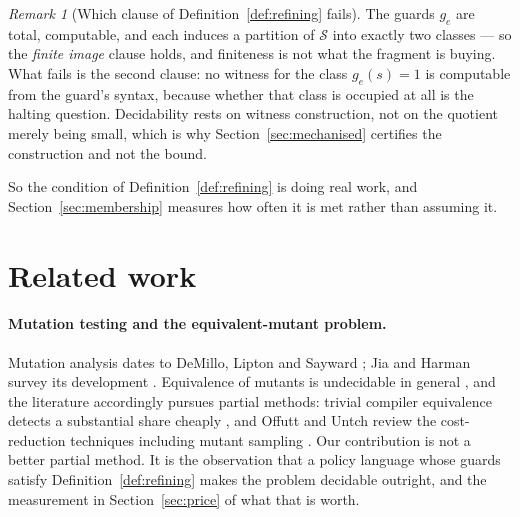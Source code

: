 \documentclass[11pt,a4paper]{article}
\theoremstyle{plain}
\theoremstyle{definition}
\theoremstyle{remark}
\newtheorem{remark}[theorem]{Remark}
\newcommand{\Sub}{\mathcal{S}}
\begin{document}
\begin{remark}[Which clause of Definition~\ref{def:refining} fails]
The guards $g_e$ are total, computable, and each induces a partition of $\Sub$ into exactly
two classes --- so the \emph{finite image} clause holds, and finiteness is not what the
fragment is buying. What fails is the second clause: no witness for the class $g_e(s) = 1$ is
computable from the guard's syntax, because whether that class is occupied at all is the
halting question. Decidability rests on witness construction, not on the quotient merely
being small, which is why Section~\ref{sec:mechanised} certifies the construction and not the
bound.
\end{remark}

So the condition of Definition~\ref{def:refining} is doing real work, and
Section~\ref{sec:membership} measures how often it is met rather than assuming it.

\section{Related work}
\label{sec:related}

\paragraph{Mutation testing and the equivalent-mutant problem.} Mutation analysis dates to
DeMillo, Lipton and Sayward \cite{demillo1978hints}; Jia and Harman survey its development
\cite{jia2011analysis}. Equivalence of mutants is undecidable in general
\cite{budd1982two}, and the literature accordingly pursues partial methods: trivial compiler
equivalence detects a substantial share cheaply \cite{papadakis2015trivial}, and Offutt and
Untch review the cost-reduction techniques including mutant sampling
\cite{offutt2001mutation}. Our contribution is not a better partial method. It is the
observation that a policy language whose guards satisfy
Definition~\ref{def:refining} makes the problem decidable outright, and the measurement in
Section~\ref{sec:price} of what that is worth.
\end{document}
